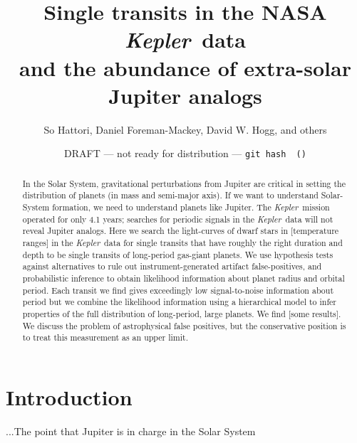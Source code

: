 \documentclass[12pt, preprint]{aastex}
\newcounter{affil}
\newcommand{\project}[1]{\textsl{#1}}
\newcommand{\Kepler}{\project{Kepler}}
\begin{document}
\title{%
  Single transits in the NASA \Kepler\ data\\
  and the abundance of extra-solar Jupiter analogs}

\author{%
  So Hattori\altaffilmark{\ref{nyuad}},
  Daniel Foreman-Mackey\altaffilmark{\ref{ccpp}},
  David W. Hogg\altaffilmark{\ref{ccpp}, \ref{cds}, \ref{mpia}},
  and others}
\label{nyuad}
\label{ccpp}
\label{cds}
\label{mpia}

\date{DRAFT --- not ready for distribution --- \texttt{git hash \githash\ (\gitdate)}}

\begin{abstract}
In the Solar System, gravitational perturbations from Jupiter are
critical in setting the distribution of planets (in mass and
semi-major axis).
If we want to understand Solar-System formation, we need to understand
planets like Jupiter.
The \Kepler\ mission operated for only 4.1 years; searches for
periodic signals in the \Kepler\ data will not reveal Jupiter analogs.
Here we search the light-curves of dwarf stars in [temperature ranges]
in the \Kepler\ data for single transits that have roughly the right
duration and depth to be single transits of long-period gas-giant
planets.
We use hypothesis tests against alternatives to rule out
instrument-generated artifact false-positives, and probabilistic
inference to obtain likelihood information about planet radius and
orbital period.
Each transit we find gives exceedingly low signal-to-noise information
about period but we combine the likelihood information using a
hierarchical model to infer properties of the full distribution of
long-period, large planets.
We find [some results].
We discuss the problem of astrophysical false positives, but the
conservative position is to treat this measurement as an upper limit.
\end{abstract}

\section{Introduction}

...The point that Jupiter is in charge in the Solar System
\end{document}
